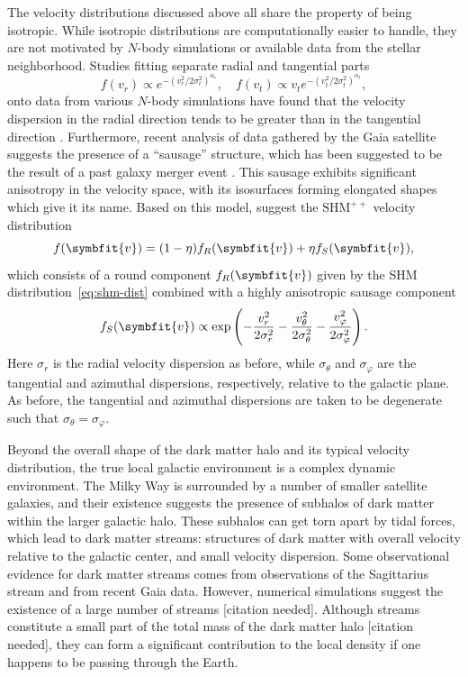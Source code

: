 \documentclass[b5paper, 10pt, twoside]{book}
\newcommand{\typographersred}{scp-red-dark-3}
\renewcommand{\vec}[1]{\symbfit{#1}}
\newcommand{\needcite}{\textcolor{\typographersred}{[citation needed]}}
\begin{document}
The velocity distributions discussed above all share the property of being isotropic. While isotropic distributions are computationally easier to handle, they are not motivated by $N$-body simulations or available data from the stellar neighborhood. Studies fitting separate radial and tangential parts
\begin{equation}
f(v_r)\propto e^{-(v_r^2/2\sigma_r^2)^{\alpha_r}},\quad f(v_t)\propto v_te^{-(v_t^2/2\sigma_t^2)^{\alpha_t}},
\end{equation}
onto data from various $N$-body simulations have found that the velocity dispersion in the radial direction tends to be greater than in the tangential direction \parencites{FairbairnSchwetz2009, KuhlenEtAl2010}. Furthermore, recent analysis of data gathered by the Gaia satellite suggests the presence of a ``sausage'' structure, which has been suggested to be the result of a past galaxy merger event \parencites{BelokurovEtAl2018, KruijssenEtAl2018, HelmiEtAl2018}. This sausage exhibits significant anisotropy  in the velocity space, with its isosurfaces forming elongated shapes which give it its name. Based on this model, \textcite{EvansOHareMcCabe2019} suggest the $\text{SHM}^{++}$ velocity distribution
\begin{equation}
f(\vec{v})=(1-\eta)f_R(\vec{v})+\eta f_S(\vec{v}),
\end{equation}
which consists of a round component $f_R(\vec{v})$ given by the SHM distribution~\eqref{eq:shm-dist} combined with a highly anisotropic sausage component
\begin{equation}
f_S(\vec{v})\propto\exp\left(-\frac{v_r^2}{2\sigma_r^2}-\frac{v_\theta^2}{2\sigma_\theta^2}-\frac{v_\varphi^2}{2\sigma_\varphi^2}\right).
\end{equation}
Here $\sigma_r$ is the radial velocity dispersion as before, while $\sigma_\theta$ and $\sigma_\varphi$ are the tangential and azimuthal dispersions, respectively, relative to the galactic plane. As before, the tangential and azimuthal dispersions are taken to be degenerate such that $\sigma_\theta=\sigma_\varphi$.

Beyond the overall shape of the dark matter halo and its typical velocity distribution, the true local galactic environment is a complex dynamic environment. The Milky Way is surrounded by a number of smaller satellite galaxies, and their existence suggests the presence of subhalos of dark matter within the larger galactic halo. These subhalos can get torn apart by tidal forces, which lead to dark matter streams: structures of dark matter with overall velocity relative to the galactic center, and small velocity dispersion. Some observational evidence for dark matter streams comes from observations of the Sagittarius stream \parencite{BelokurovEtAl2013} and from recent Gaia data\parencite{NecibLisantiBelokurov2019}. However, numerical simulations suggest the existence of a large number of streams \needcite. Although streams constitute a small part of the total mass of the dark matter halo \needcite, they can form a significant contribution to the local density if one happens to be passing through the Earth.
\end{document}
